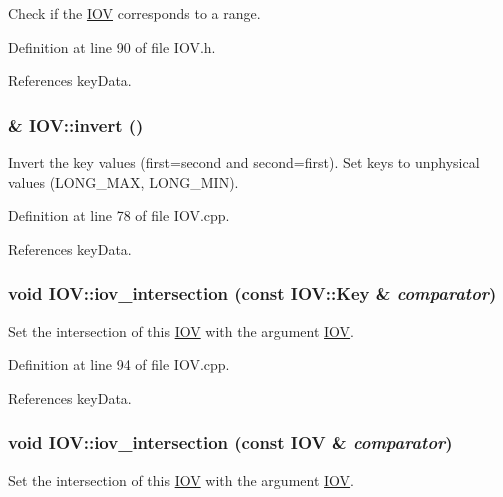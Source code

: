 Check if the \hyperlink{class_d_d4hep_1_1_i_o_v}{IOV} corresponds to a range. 

Definition at line 90 of file IOV.h.

References keyData.\hypertarget{class_d_d4hep_1_1_i_o_v_a5407ab1da0910ee18ca80dfa6985d0af}{
\subsubsection[{invert}]{ \& IOV::invert ()}}
\label{class_d_d4hep_1_1_i_o_v_a5407ab1da0910ee18ca80dfa6985d0af}


Invert the key values (first=second and second=first). Set keys to unphysical values (LONG\_\-MAX, LONG\_\-MIN). 

Definition at line 78 of file IOV.cpp.

References keyData.\hypertarget{class_d_d4hep_1_1_i_o_v_ab045b2ff365c11e6ff93c4ca01270a49}{
\subsubsection[{iov\_\-intersection}]{\setlength{\rightskip}{0pt plus 5cm}void IOV::iov\_\-intersection (const {\bf IOV::Key} \& {\em comparator})}}
\label{class_d_d4hep_1_1_i_o_v_ab045b2ff365c11e6ff93c4ca01270a49}


Set the intersection of this \hyperlink{class_d_d4hep_1_1_i_o_v}{IOV} with the argument \hyperlink{class_d_d4hep_1_1_i_o_v}{IOV}. 

Definition at line 94 of file IOV.cpp.

References keyData.\hypertarget{class_d_d4hep_1_1_i_o_v_ae6f8261feefa4678c0842d43946d146d}{
\subsubsection[{iov\_\-intersection}]{\setlength{\rightskip}{0pt plus 5cm}void IOV::iov\_\-intersection (const {\bf IOV} \& {\em comparator})}}
\label{class_d_d4hep_1_1_i_o_v_ae6f8261feefa4678c0842d43946d146d}


Set the intersection of this \hyperlink{class_d_d4hep_1_1_i_o_v}{IOV} with the argument \hyperlink{class_d_d4hep_1_1_i_o_v}{IOV}. 

